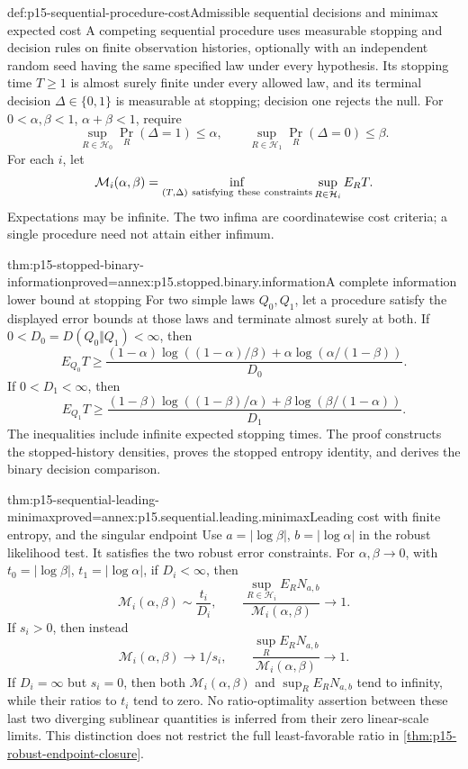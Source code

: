 \begin{hbdefinition}{def:p15-sequential-procedure-cost}{Admissible sequential decisions and minimax expected cost}
A competing sequential procedure uses measurable stopping and decision
rules on finite observation histories, optionally with an independent
random seed having the same specified law under every hypothesis.
Its stopping time \(T\geq1\) is almost surely finite under every allowed
law, and its terminal decision \(\Delta\in\{0,1\}\) is measurable at
stopping; decision one rejects the null.
For \(0<\alpha,\beta<1\), \(\alpha+\beta<1\), require
\[
 \sup_{R\in\mathcal H_0}\Pr_R(\Delta=1)\leq\alpha,\qquad
 \sup_{R\in\mathcal H_1}\Pr_R(\Delta=0)\leq\beta.
\]
For each \(i\), let
\[
 \mathcal M_i(\alpha,\beta)=
 \inf_{(T,\Delta)\ {\rm satisfying\ these\ constraints}}
                 \sup_{R\in\mathcal H_i}E_RT .
\]
Expectations may be infinite. The two infima are coordinatewise
cost criteria; a single procedure need not attain either infimum.
\end{hbdefinition}

\begin{hbtheorem}{thm:p15-stopped-binary-information}{proved=annex:p15.stopped.binary.information}{A complete information lower bound at stopping}
For two simple laws \(Q_0,Q_1\), let a procedure satisfy the displayed
error bounds at those laws and terminate almost surely at both.
If \(0<D_0=D(Q_0\Vert Q_1)<\infty\), then
\[
 E_{Q_0}T\geq
 \frac{(1-\alpha)\log((1-\alpha)/\beta)
                +\alpha\log(\alpha/(1-\beta))}{D_0}.
\]
If \(0<D_1<\infty\), then
\[
 E_{Q_1}T\geq
 \frac{(1-\beta)\log((1-\beta)/\alpha)
                +\beta\log(\beta/(1-\alpha))}{D_1}.
\]
The inequalities include infinite expected stopping times.
The proof constructs the stopped-history densities, proves the
stopped entropy identity, and derives the binary decision comparison.
\end{hbtheorem}

\begin{hbtheorem}{thm:p15-sequential-leading-minimax}{proved=annex:p15.sequential.leading.minimax}{Leading cost with finite entropy, and the singular endpoint}
Use \(a=|\log\beta|\), \(b=|\log\alpha|\) in the robust likelihood test.
It satisfies the two robust error constraints.
For \(\alpha,\beta\to0\), with \(t_0=|\log\beta|\),
\(t_1=|\log\alpha|\), if \(D_i<\infty\), then
\[
 \mathcal M_i(\alpha,\beta)\sim \frac{t_i}{D_i},\qquad
 \frac{\sup_{R\in\mathcal H_i}E_RN_{a,b}}
              {\mathcal M_i(\alpha,\beta)}\longrightarrow1.
\]
If \(s_i>0\), then instead
\[
 \mathcal M_i(\alpha,\beta)\longrightarrow1/s_i,\qquad
 \frac{\sup_R E_RN_{a,b}}{\mathcal M_i(\alpha,\beta)}
                 \longrightarrow1.
\]
If \(D_i=\infty\) but \(s_i=0\), then both
\(\mathcal M_i(\alpha,\beta)\) and \(\sup_RE_RN_{a,b}\)
tend to infinity, while their ratios to \(t_i\) tend to zero.
No ratio-optimality assertion between these last two diverging
sublinear quantities is inferred from their zero linear-scale limits.
This distinction does not restrict the full least-favorable ratio
in \cref{thm:p15-robust-endpoint-closure}.
\end{hbtheorem}

